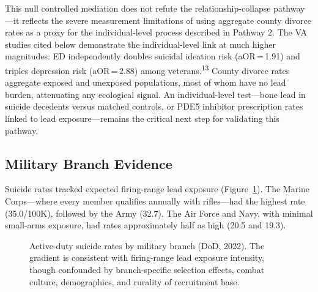\documentclass[11pt,twocolumn]{article}
\begin{document}
This null controlled mediation does not refute the relationship-collapse pathway---it reflects the severe measurement limitations of using aggregate county divorce rates as a proxy for the individual-level process described in Pathway 2. The VA studies cited below demonstrate the individual-level link at much higher magnitudes: ED independently doubles suicidal ideation risk (aOR\,=\,1.91) and triples depression risk (aOR\,=\,2.88) among veterans.\textsuperscript{13} County divorce rates aggregate exposed and unexposed populations, most of whom have no lead burden, attenuating any ecological signal. An individual-level test---bone lead in suicide decedents versus matched controls, or PDE5 inhibitor prescription rates linked to lead exposure---remains the critical next step for validating this pathway.

\subsection{Military Branch Evidence}

Suicide rates tracked expected firing-range lead exposure (Figure~\ref{fig:branches}). The Marine Corps---where every member qualifies annually with rifles---had the highest rate (35.0/100K), followed by the Army (32.7). The Air Force and Navy, with minimal small-arms exposure, had rates approximately half as high (20.5 and 19.3).

\begin{figure}[H]
\centering
{}
\caption{Active-duty suicide rates by military branch (DoD, 2022). The gradient is consistent with firing-range lead exposure intensity, though confounded by branch-specific selection effects, combat culture, demographics, and rurality of recruitment base.}
\label{fig:branches}
\end{figure}
\end{document}

